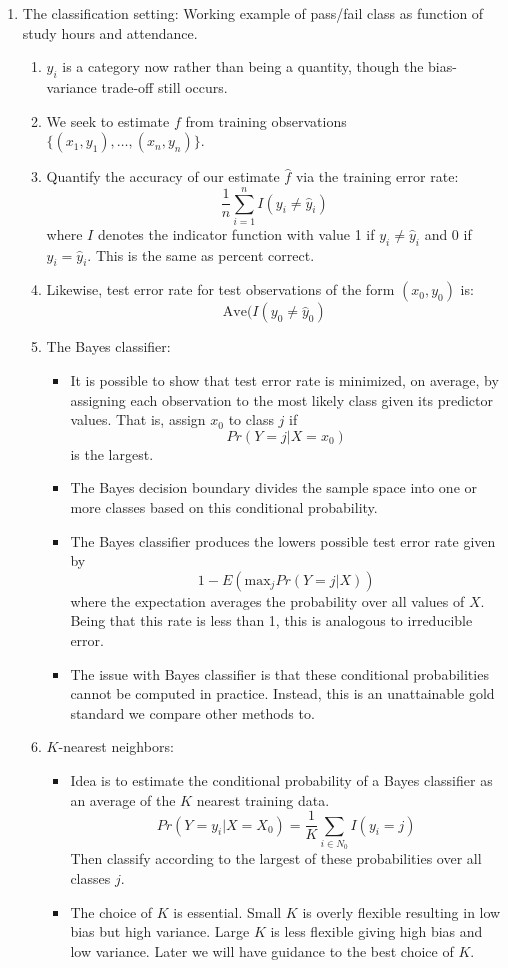 \documentclass{article}
\begin{document}
\begin{enumerate}
\begin{enumerate}
\end{enumerate}

\item The classification setting: Working example of pass/fail class as function of study hours and attendance.
\begin{enumerate}
\item $y_i$ is a category now rather than being a quantity, though the bias-variance trade-off still occurs.
\item We seek to estimate $f$ from training observations $\{(x_1, y_1), \dots, (x_n, y_n) \}$.
\item Quantify the accuracy of our estimate $\hat{f}$ via the training error rate:
\[
\frac{1}{n} \sum_{i=1}^n I(y_i \neq \hat{y}_i)
\]
where $I$ denotes the indicator function with value 1 if $y_i \neq \hat{y}_i$ and 0 if $y_i = \hat{y}_i$. This is the same as percent correct.
\item Likewise, test error rate for test observations of the form $(x_0, y_0)$ is:
\[
\text{Ave}(I(y_0 \neq \hat{y}_0)
\]
\item The Bayes classifier:
\begin{itemize}
\item It is possible to show that test error rate is minimized, on average, by assigning each observation to the most likely class given its predictor values. That is, assign $x_0$ to class $j$ if
\[
Pr(Y=j | X=x_0)
\]
is the largest.
\item The Bayes decision boundary divides the sample space into one or more classes based on this conditional probability.
\item The Bayes classifier produces the lowers possible test error rate given by 
\[
1-E(\text{max}_j Pr(Y=j | X))
\]
where the expectation averages the probability over all values of $X$. Being that this rate is less than 1, this is analogous to irreducible error.
\item The issue with Bayes classifier is that these conditional probabilities cannot be computed in practice. Instead, this is an unattainable gold standard we compare other methods to.
\end{itemize}

\item $K$-nearest neighbors:
\begin{itemize}
\item Idea is to estimate the conditional probability of a Bayes classifier as an average of the $K$ nearest training data. 
\[
Pr(Y=y_i | X=X_0) = \frac{1}{K} \sum_{i \in N_0} I(y_i=j)
\]
Then classify according to the largest of these probabilities over all classes $j$.
\item The choice of $K$ is essential. Small $K$ is overly flexible resulting in low bias but high variance. Large $K$ is less flexible giving high bias and low variance. Later we will have guidance to the best choice of $K$.
\end{itemize}
\end{enumerate}
\end{enumerate}
\end{document}
